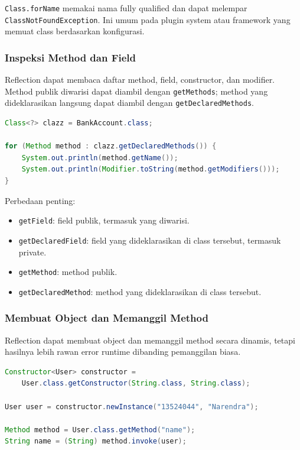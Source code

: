 \texttt{Class.forName} memakai nama fully qualified dan dapat melempar \texttt{ClassNotFoundException}. Ini umum pada plugin system atau framework yang memuat class berdasarkan konfigurasi.

\subsubsection{Inspeksi Method dan Field}

\begin{jawab}
Reflection dapat membaca daftar method, field, constructor, dan modifier. Method publik diwarisi dapat diambil dengan \texttt{getMethods}; method yang dideklarasikan langsung dapat diambil dengan \texttt{getDeclaredMethods}.
\end{jawab}

\begin{lstlisting}[language=Java, caption={Inspeksi method dengan reflection}, label={lst:inspect-methods}]
Class<?> clazz = BankAccount.class;

for (Method method : clazz.getDeclaredMethods()) {
    System.out.println(method.getName());
    System.out.println(Modifier.toString(method.getModifiers()));
}
\end{lstlisting}

Perbedaan penting:

\begin{itemize}
    \item \texttt{getField}: field publik, termasuk yang diwarisi.
    \item \texttt{getDeclaredField}: field yang dideklarasikan di class tersebut, termasuk private.
    \item \texttt{getMethod}: method publik.
    \item \texttt{getDeclaredMethod}: method yang dideklarasikan di class tersebut.
\end{itemize}

\subsubsection{Membuat Object dan Memanggil Method}

\begin{jawab}
Reflection dapat membuat object dan memanggil method secara dinamis, tetapi hasilnya lebih rawan error runtime dibanding pemanggilan biasa.
\end{jawab}

\begin{lstlisting}[language=Java, caption={Instansiasi dan pemanggilan method dengan reflection}, label={lst:reflection-invoke}]
Constructor<User> constructor =
    User.class.getConstructor(String.class, String.class);

User user = constructor.newInstance("13524044", "Narendra");

Method method = User.class.getMethod("name");
String name = (String) method.invoke(user);
\end{lstlisting}

